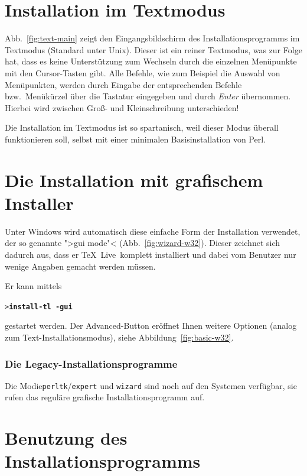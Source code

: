\documentclass[12pt,ngerman,a4paper,fullparskip]{scrreprt}
\newcommand{\TL}{\TeX\ Live\xspace}
\newcommand{\Ucom}[1]{\textbf{\texttt{#1}}}
\begin{document}
\section{Installation im Textmodus}

Abb.~\ref{fig:text-main} zeigt den Eingangsbildschirm des Installationsprogramms im Textmodus (Standard unter Unix). Dieser ist ein reiner Textmodus, was zur Folge hat, dass es keine Unterstützung zum Wechseln durch die einzelnen Menüpunkte mit den Cursor-Tasten gibt. Alle Befehle, wie zum Beispiel die Auswahl von Menüpunkten, werden durch Eingabe der entsprechenden Befehle bzw.\ Menükürzel über die Tastatur eingegeben und durch \emph{Enter} übernommen. Hierbei wird zwischen Groß- und Kleinschreibung unterschieden!

Die Installation im Textmodus ist so spartanisch, weil dieser Modus überall funktionieren soll, selbst mit einer minimalen Basisinstallation von Perl.

\section{Die Installation mit grafischem Installer}

Unter Windows wird automatisch diese einfache Form der Installation verwendet,
der so genannte ">gui mode"< (Abb.~\ref{fig:wizard-w32}). Dieser zeichnet sich dadurch aus, dass er \TL\ komplett installiert und dabei vom Benutzer nur wenige Angaben gemacht werden müssen. 

Er kann mittels 

\begin{alltt}
> \Ucom{install-tl -gui}
\end{alltt}

gestartet werden.  Der Advanced-Button eröffnet Ihnen weitere Optionen (analog zum Text-Installationsmodus), siehe  Abbildung~\ref{fig:basic-w32}.

\subsubsection{Die Legacy-Installationsprogramme}

Die Modie\texttt{perltk}/\texttt{expert} und \texttt{wizard} sind noch auf den Systemen verfügbar, sie rufen das reguläre grafische Installationsprogramm auf.

\section{Benutzung des Installationsprogramms}\label{sec:runinstall}
\end{document}

